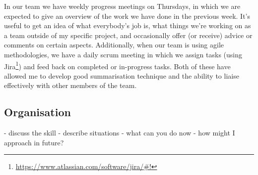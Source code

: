 \documentclass[a4paper,11pt]{article} %
\begin{document}
In our team we have weekly progress meetings on Thursdays, in which we are expected to give an overview of the work we have done in the previous week.  It's useful to get an idea of what everybody's job is, what things we're working on as a team outside of my specific project, and occasionally offer (or receive) advice or comments on certain aspects.  Additionally, when our team is using agile methodologies, we have a daily scrum meeting in which we assign tasks (using Jira\footnote{\url{https://www.atlassian.com/software/jira/#!}}) and feed back on completed or in-progress tasks.  Both of these have allowed me to develop good summarisation technique and the ability to liaise effectively with other members of the team.

\subsection{Organisation}
\label{sec:transferable.organisation}

- discuss the skill
- describe situations
- what can you do now
- how might I approach in future?
\end{document}
